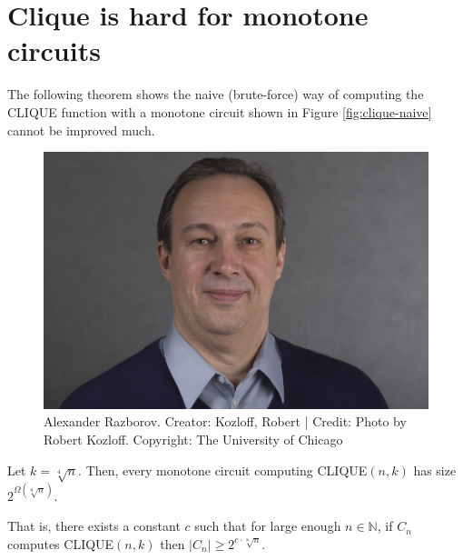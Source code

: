% 
% 
% 
% 
% 
% 
% 
% 



\section{Clique is hard for monotone circuits }
The following theorem shows the naive (brute-force) way of computing the CLIQUE function with a monotone circuit shown in Figure \ref{fig:clique-naive}    cannot be improved much.

\begin{figure}
    \centering
    \includegraphics[width=0.3\linewidth]{images/RAZBOROV_Alexander.jpeg}
    \caption{Alexander Razborov. Creator: Kozloff, Robert | Credit: Photo by Robert Kozloff.
Copyright: The University of Chicago}
    \label{fig:enter-label}
\end{figure}


\begin{tcolorbox}[colframe=white, colback=blue!5, boxrule=0mm, sharp corners]
\begin{theorem}\label{thm:razborov} Let $k=\sqrt[4]{n}$. Then, every monotone circuit computing {\rm CLIQUE}$(n, k)$ has size $2^{\Omega(\sqrt[8]{n})}$.
\end{theorem}
\end{tcolorbox}
That is, there exists a constant $c$ such that  for large enough $n \in \mathbb{N}$, if $C_n$ computes CLIQUE$(n,k)$ then $\left|C_n\right| \geq 2^{c \cdot \sqrt[8]{n}}$.


